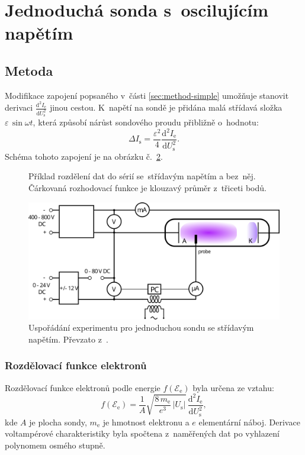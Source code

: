 \documentclass{protokol}
\newcommand\elemcharge{e}
\newcommand\masselec{m_\mathrm{e}}
\newcommand\iprobe{I_\mathrm{s}}
\newcommand\ielec{I_\mathrm{e}}
\newcommand\uprobe{U_\mathrm{s}}
\newcommand\didu{\frac{\mathrm d^2 \ielec}{\mathrm d \uprobe^2}}
\newcommand\enelec{\mathcal E_\mathrm{e}}
\newcommand\eedf{f(\enelec)}
\newcommand\ueedf{\varepsilon}
\begin{document}
\clearpage
\section{Jednoduchá sonda s~oscilujícím napětím}
\label{sec:eedf}

\subsection{Metoda}
\label{sec:method-eedf}
Modifikace zapojení popsaného v~části \ref{sec:method-simple}
umožňuje stanovit derivaci $\didu$ jinou cestou.
K~napětí na sondě je přidána malá střídavá složka $\ueedf\,\sin{\omega t}$,
která způsobí nárůst sondového proudu přibližně o~hodnotu:
\begin{equation}
	\label{eq:eedf-idiff}
	\Delta\iprobe = \frac{\ueedf^2}{4}\didu.
\end{equation}
Schéma tohoto zapojení je na obrázku č.~\ref{fig:diagram-eedf}.

\begin{figure}[hbp]
	\centering
	
	\caption{Příklad rozdělení dat do sérií se~střídavým napětím a bez~něj.
		Čárkovaná rozhodovací funkce je klouzavý průměr z~třiceti bodů.}
	\label{fig:separation}
\end{figure}

\begin{figure}[hbp]
	\centering
	\includegraphics{diagram-eedf.png}
	\caption{Uspořádání experimentu pro jednoduchou sondu se střídavým napětím.
		Převzato z~\autocite{assignment-simpleprobe}.}
	\label{fig:diagram-eedf}
\end{figure}

\subsubsection{Rozdělovací funkce elektronů}
Rozdělovací funkce elektronů podle energie $\eedf$ byla určena ze vztahu:
\begin{equation}
	\label{eq:eedf}
	\eedf = \frac{1}{A} \sqrt{\frac{8\,\masselec}{\elemcharge^3}\,|\uprobe|}
		\,\frac{\mathrm d^2 \ielec}{\mathrm d\uprobe^2},
\end{equation}
kde $A$ je plocha sondy, $\masselec$ je hmotnost elektronu
a $\elemcharge$ elementární náboj.
Derivace voltampérové charakteristiky byla spočtena z~naměřených dat
po vyhlazení polynomem osmého stupně.
\end{document}
